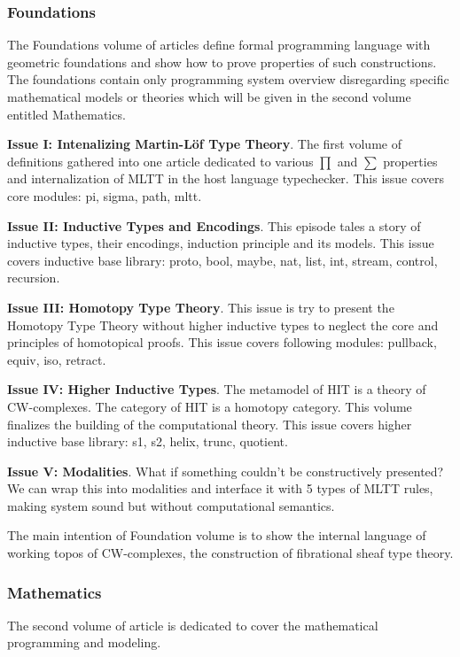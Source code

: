 \documentclass[twoside]{article}
\theoremstyle{definition}
\begin{document}
\subsubsection*{Foundations}

The Foundations volume of articles define formal programming language
with geometric foundations and show how to prove properties of such constructions.
The foundations contain only programming system overview disregarding specific mathematical
models or theories which will be given in the second volume entitled Mathematics.

{\bf Issue I: Intenalizing Martin-Löf Type Theory}.
The first volume of definitions gathered into one article dedicated to
various $\prod$ and $\sum$ properties and internalization of MLTT in the host language typechecker.
This issue covers core modules: pi, sigma, path, mltt.

{\bf Issue II: Inductive Types and Encodings}.
This episode tales a story of inductive types, their encodings,
induction principle and its models.
This issue covers inductive base library: proto, bool, maybe, nat, list, int, stream, control, recursion.

{\bf Issue III: Homotopy Type Theory}.
This issue is try to present the Homotopy Type Theory without higher inductive types
to neglect the core and principles of homotopical proofs.
This issue covers following modules: pullback, equiv, iso, retract.

{\bf Issue IV: Higher Inductive Types}.
The metamodel of HIT is a theory of CW-complexes. The category of HIT is a homotopy category.
This volume finalizes the building of the computational theory.
This issue covers higher inductive base library: s1, s2, helix, trunc, quotient.

{\bf Issue V: Modalities}. What if something couldn't be constructively
presented? We can wrap this into modalities and interface it with 5 types
of MLTT rules, making system sound but without computational semantics.

The main intention of Foundation volume is to show the internal language
of working topos of CW-complexes, the construction of fibrational sheaf type theory.

\subsubsection*{Mathematics}

The second volume of article is dedicated to cover the mathematical
programming and modeling.
\end{document}
